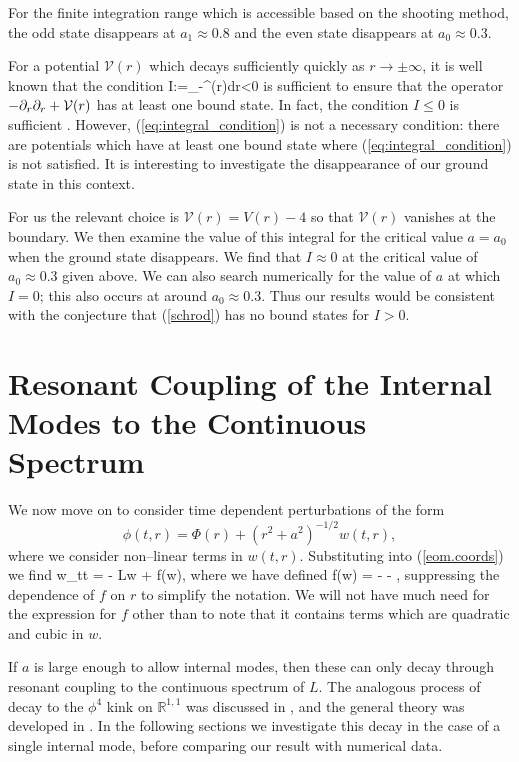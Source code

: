 For the finite integration range which is accessible based on the shooting method, the odd state disappears at $a_1 \approx 0.8$ and the even state disappears at $a_0 \approx 0.3$.

For a potential $\mathcal{V}(r)$ which decays sufficiently quickly as $r\rightarrow\pm\infty$, it is well known that the condition
\be
\label{eq:integral_condition}
I:=\int_{-\infty}^{\infty}(r)dr<0
\ee
is sufficient to ensure that the operator $-\partial_r\partial_r + \mathcal{V}(r)$ has at least one bound state. In fact, the condition $I\leq 0$ is sufficient \cite{BarrySimon}. However, (\ref{eq:integral_condition}) is not a necessary condition: there are potentials which have at least one bound state where (\ref{eq:integral_condition}) is not satisfied. It is interesting to investigate the disappearance of our ground state in this context.

For us the relevant choice is $\mathcal{V}(r)=V(r)-4$ so that $\mathcal{V}(r)$ vanishes at the boundary. We then examine the value of this integral for the critical value $a=a_0$ when the ground state disappears. We find that $I\approx0$ at the critical value of $a_0 \approx 0.3$ given above. We can also search numerically for the value of $a$ at which $I=0$; this also occurs at around $a_0 \approx 0.3$. Thus our results would be consistent with the conjecture that (\ref{schrod}) has no bound states for $I>0$.

\section{Resonant Coupling of the Internal Modes to the Continuous Spectrum} \label{sec:dynamics}
We now move on to consider time dependent perturbations of the form
\[
\phi(t,r) = \Phi(r) + (r^2+a^2)^{-1/2}w(t,r),
\]
where we consider non--linear terms in $w(t,r)$. Substituting into (\ref{eom.coords}) we find
\be
\label{eq:nonsmall_pert}
w_{tt} = - Lw + f(w),
\ee
where we have defined
\be \label{eq:f}
f(w) = -  - ,
\ee
suppressing the dependence of $f$ on $r$ to simplify the notation. We will not have much need for the expression for $f$ other than to note that it contains terms which are quadratic and cubic in $w$.

If $a$ is large enough to allow internal modes, then these can only decay through resonant coupling to the continuous spectrum of $L$. The analogous process of decay to the $\phi^4$ kink on $\mathbb{R}^{1,1}$ was discussed in \cite{Manton&Merabet}, and the general theory was developed in \cite{SW98}. In the following sections we investigate this decay in the case of a single internal mode, before comparing our result with numerical data.

